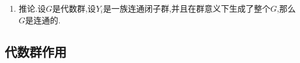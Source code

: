 \begin{enumerate}
\begin{enumerate}[(1)]
\begin{proof}
        	\qquad
        	
        	取$I$中的两个有限序列$b=(b_1,\cdots,b_n),c=(c_1,\cdots,c_m)$,记$(b,c)=(b_1,\cdots,b_n,c_1,\cdots,c_m)$.我们断言有$\overline{Y_b}\overline{Y_c}\subseteq\overline{Y_{(b,c)}}$.事实上任取$x\in Y_c$,那么右乘$x$这个同构就把$Y_b$映入$Y_{(b,c)}$,进而把$\overline{Y_b}$映入$\overline{Y_{(b,c)}}$.于是得到$\overline{Y_b}Y_c\subseteq\overline{Y_{(b,c)}}$.于是对$x\in\overline{Y_b}$就有左乘$x$把$Y_c$映入$\overline{Y_{(b,c)}}$,进而它把$\overline{Y_c}$映入$\overline{Y_{(b,c)}}$.综上$\overline{Y_b}\overline{Y_c}\subseteq\overline{Y_{(b,c)}}$.
        	
        	\qquad
        	
        	按照$\overline{Y_a}$是极大的,对任意$I$中的有限序列$b$就有$\overline{Y_a}\subseteq\overline{Y_a}\overline{Y_b}\subseteq\overline{Y_{(a,b)}}=\overline{Y_a}$.取$b=a$和$b$为$a$的逆序列(此即如果记$a=(a_1,\cdots,a_n)$,我们之前扩充$I$使得每个$f_{a_i}^{-1}$也在指标$I$中,把它对应的指标记作$b_i$,那么取$b=(b_1,\cdots,b_n)$),就得到$\overline{Y_a}$是$G$的闭子群,并且包含了全部$Y_i$(否则$Y_a$再乘上$Y_i$取闭包和极大性矛盾).进而有$\overline{Y_a}=\mathscr{A}(M)$.最后按照$Y_a$是可构造子集,并且它在$\overline{Y_a}$中稠密(因为不可约性),就有$\overline{Y_a}=Y_aY_a=Y_{(a,a)}$.
        \end{proof}
        \item 推论.设$G$是代数群,设$Y_i$是一族连通闭子群,并且在群意义下生成了整个$G$,那么$G$是连通的.
    \end{enumerate}
\end{enumerate}
\subsection{代数群作用}

